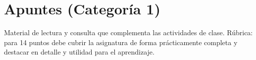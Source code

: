 \chapter{Apuntes (Categoría 1)}

\begin{introcategoria}
Material de lectura y consulta que complementa las actividades de clase.
Rúbrica: para 14 puntos debe cubrir la asignatura de forma prácticamente completa
y destacar en detalle y utilidad para el aprendizaje.
\end{introcategoria}

